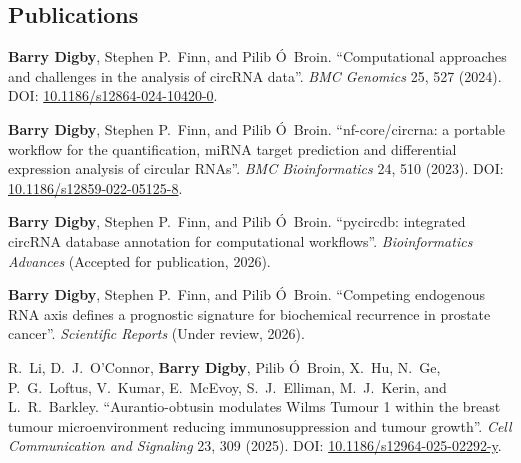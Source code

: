 \begin{center}
    \vspace*{1.5cm}
    \section*{Publications}
    \vspace{0.5cm}
\end{center}

\justifying
\normalsize

\noindent \textbf{Barry Digby}, Stephen P.~Finn, and Pilib \'{O}~Broin. ``Computational approaches and challenges in the analysis of circRNA data''. \textit{BMC Genomics} 25, 527 (2024). DOI: \href{https://doi.org/10.1186/s12864-024-10420-0}{10.1186/s12864-024-10420-0}.

\vspace{0.8cm}

\noindent \textbf{Barry Digby}, Stephen P.~Finn, and Pilib \'{O}~Broin. ``nf-core/circrna: a portable workflow for the quantification, miRNA target prediction and differential expression analysis of circular RNAs''. \textit{BMC Bioinformatics} 24, 510 (2023). DOI: \href{https://doi.org/10.1186/s12859-022-05125-8}{10.1186/s12859-022-05125-8}.

\vspace{0.8cm}

\noindent \textbf{Barry Digby}, Stephen P.~Finn, and Pilib \'{O}~Broin. ``pycircdb: integrated circRNA database annotation for computational workflows''. \textit{Bioinformatics Advances} (Accepted for publication, 2026).

\vspace{0.8cm}

\noindent \textbf{Barry Digby}, Stephen P.~Finn, and Pilib \'{O}~Broin. ``Competing endogenous RNA axis defines a prognostic signature for biochemical recurrence in prostate cancer''. \textit{Scientific Reports} (Under review, 2026).

\vspace{0.8cm}

\noindent R.~Li, D.~J.~O'Connor, \textbf{Barry Digby}, Pilib \'{O}~Broin, X.~Hu, N.~Ge, P.~G.~Loftus, V.~Kumar, E.~McEvoy, S.~J.~Elliman, M.~J.~Kerin, and L.~R.~Barkley. ``Aurantio-obtusin modulates Wilms Tumour 1 within the breast tumour microenvironment reducing immunosuppression and tumour growth''. \textit{Cell Communication and Signaling} 23, 309 (2025). DOI: \href{https://doi.org/10.1186/s12964-025-02292-y}{10.1186/s12964-025-02292-y}.


